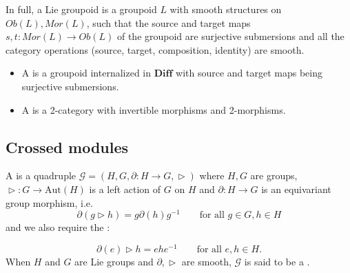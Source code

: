 In full, a Lie groupoid is a groupoid $L$ with smooth structures on $Ob(L),Mor(L)$, such that the source and target maps $s,t:Mor(L)\rightarrow Ob(L)$ of the groupoid are surjective submersions and all the category operations (source, target, composition, identity) are smooth.

\begin{definition}
\begin{itemize}
 \item A  is a groupoid internalized in $\mathbf{Diff}$ with source and target maps being surjective submersions.
\item A  is a 2-category with invertible morphisms and 2-morphisms.
\end{itemize}


\end{definition}



\subsection{Crossed modules}

\begin{definition}
 A  is a quadruple $\mathcal{G}=(H,G,\partial:H\rightarrow G,\vartriangleright)$ where $H,G$ are groups, $\vartriangleright:G\rightarrow \text{Aut}(H)$ is a left action of $G$ on $H$ and $\partial:H\rightarrow G$ is an equivariant group morphism, i.e.
\[
 \partial (g\vartriangleright h)=g\partial(h)g^{-1}\qquad \text{for all }g\in G,h\in H
\]
and we also require the :

\[\partial(e)\vartriangleright h=ehe^{-1} \qquad \text{for all }e,h\in H.\]
When $H$ and $G$ are Lie groups and $\partial,\vartriangleright$ are smooth, $\mathcal{G}$ is said to be a .
\end{definition}

